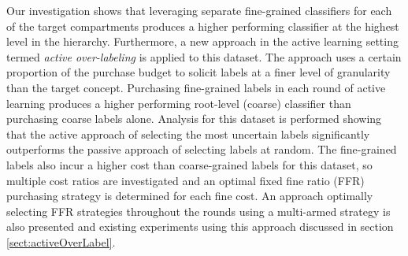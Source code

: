 \documentclass[ms]{nuthesis}
\begin{document}
Our investigation shows that leveraging separate
fine-grained classifiers for each of the target compartments produces a higher
performing classifier at the highest level in the hierarchy.
Furthermore, a new approach in the
active learning setting termed \textit{active over-labeling} is applied to this dataset.
The approach uses a certain proportion of the purchase budget to solicit
labels at a finer level of granularity than the target concept.
Purchasing fine-grained labels in each round of active learning produces a
higher performing root-level (coarse) classifier than purchasing coarse
labels alone. Analysis for this dataset is performed showing that
 the active approach of selecting the most uncertain labels significantly
 outperforms the passive approach of selecting labels at random.
The fine-grained labels also incur a higher cost than coarse-grained
labels for this dataset, so multiple cost ratios are investigated and an optimal fixed fine
ratio (FFR)
purchasing strategy is determined for each fine cost. An approach optimally selecting
 FFR strategies throughout the rounds using a multi-armed strategy is also presented
 and existing experiments using this approach discussed in section \ref{sect:activeOverLabel}.
\end{document}
